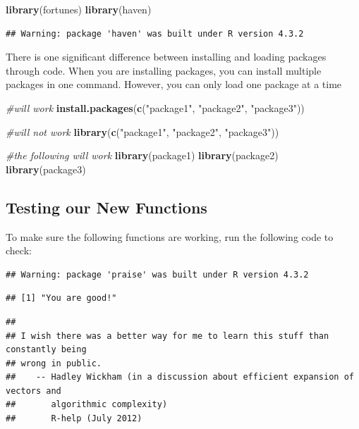\documentclass[
]{book}
\newenvironment{Shaded}{\begin{snugshade}}{\end{snugshade}}
\newcommand{\CommentTok}[1]{\textcolor[rgb]{0.56,0.35,0.01}{\textit{#1}}}
\newcommand{\FunctionTok}[1]{\textcolor[rgb]{0.13,0.29,0.53}{\textbf{#1}}}
\newcommand{\NormalTok}[1]{#1}
\newcommand{\StringTok}[1]{\textcolor[rgb]{0.31,0.60,0.02}{#1}}
\begin{document}
\begin{Shaded}
\begin{Highlighting}[]
\FunctionTok{library}\NormalTok{(fortunes)}
\FunctionTok{library}\NormalTok{(haven)}
\end{Highlighting}
\end{Shaded}

\begin{verbatim}
## Warning: package 'haven' was built under R version 4.3.2
\end{verbatim}

There is one significant difference between installing and loading packages through code. When you are installing packages, you can install multiple packages in one command. However, you can only load one package at a time

\begin{Shaded}
\begin{Highlighting}[]
\CommentTok{\#will work}
\FunctionTok{install.packages}\NormalTok{(}\FunctionTok{c}\NormalTok{(}\StringTok{"package1"}\NormalTok{, }\StringTok{"package2"}\NormalTok{, }\StringTok{"package3"}\NormalTok{)) }


\CommentTok{\#will not work}
\FunctionTok{library}\NormalTok{(}\FunctionTok{c}\NormalTok{(}\StringTok{"package1"}\NormalTok{, }\StringTok{"package2"}\NormalTok{, }\StringTok{"package3"}\NormalTok{)) }

\CommentTok{\#the following will work}
\FunctionTok{library}\NormalTok{(package1)}
\FunctionTok{library}\NormalTok{(package2)}
\FunctionTok{library}\NormalTok{(package3)}
\end{Highlighting}
\end{Shaded}

\hypertarget{testing-our-new-functions}{%
\subsection{Testing our New Functions}\label{testing-our-new-functions}}

To make sure the following functions are working, run the following code to check:

\begin{verbatim}
## Warning: package 'praise' was built under R version 4.3.2
\end{verbatim}

\begin{verbatim}
## [1] "You are good!"
\end{verbatim}

\begin{verbatim}
## 
## I wish there was a better way for me to learn this stuff than constantly being
## wrong in public.
##    -- Hadley Wickham (in a discussion about efficient expansion of vectors and
##       algorithmic complexity)
##       R-help (July 2012)
\end{verbatim}
\end{document}
